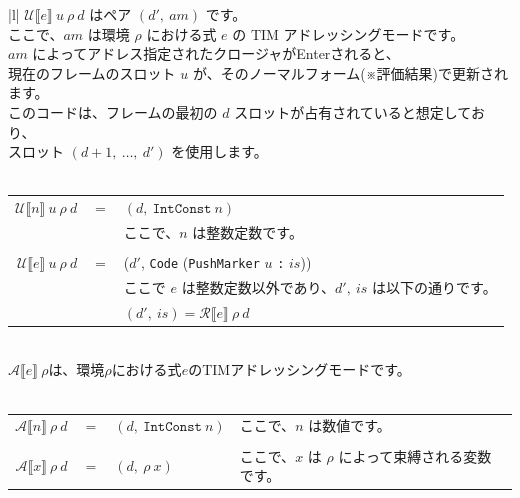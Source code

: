 \documentclass{jbook}
\begin{document}
\begin{tabular} {|l|} \hline
	$\mathcal{U} \llbracket e \rrbracket ~ u ~ \rho ~ d$ はペア $(d', ~ am)$ です。                        \\
	ここで、$am$ は環境 $\rho$ における式 $e$ の TIM アドレッシングモードです。                            \\
	$am$ によってアドレス指定されたクロージャがEnterされると、                                             \\
	現在のフレームのスロット $u$ が、そのノーマルフォーム(※評価結果)で更新されます。                       \\
	このコードは、フレームの最初の $d$ スロットが占有されていると想定しており、                            \\
	スロット $(d + 1, ~ \ldots, ~ d')$ を使用します。                                                      \\
	\\
	\begin{tabular}{r c l}
		$\mathcal{U} \llbracket n \rrbracket ~ u ~ \rho ~ d$ & $=$ & $(d, ~ \texttt{IntConst} ~ n)$                                  \\
		                                                     &     & ここで、$n$ は整数定数です。                                    \\
		\\
		$\mathcal{U} \llbracket e \rrbracket ~ u ~ \rho ~ d$ & $=$ & ($d'$, \texttt{Code} (\texttt{PushMarker} $u$ \texttt{:} $is$)) \\
		                                                     &     & ここで $e$ は整数定数以外であり、$d', ~ is$ は以下の通りです。  \\
		                                                     &     & $(d', ~ is) = \mathcal{R} \llbracket e \rrbracket ~ \rho ~ d$   \\
	\end{tabular}
	\\ \hline
	$\mathcal{A} \llbracket e \rrbracket ~ \rho$は、環境$\rho$における式$e$のTIMアドレッシングモードです。 \\
	\\
	\begin{tabular}{r c l l}
		$\mathcal{A} \llbracket n \rrbracket ~ \rho ~ d$ & $=$ & $(d, ~ \texttt{IntConst} ~ n)$ & ここで、$n$ は数値です。                           \\
		\\
		$\mathcal{A} \llbracket x \rrbracket ~ \rho ~ d$ & $=$ & $(d, ~ \rho ~ x)$              & ここで、$x$ は $\rho$ によって束縛される変数です。 \\

\end{tabular}
\end{tabular}
\end{document}
